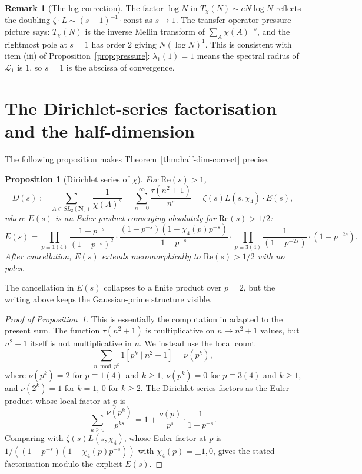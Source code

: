 ﻿\documentclass[11pt]{article}
\newtheorem{proposition}[theorem]{Proposition}
\theoremstyle{definition}
\newtheorem{remark}[theorem]{Remark}
\newcommand{\Nz}{\mathbf{N}_0}
\newcommand{\SLNz}{SL_2(\Nz)}
\newcommand{\Lop}{\mathcal{L}}
\newcommand{\chiA}{\chi}
\begin{document}
\begin{remark}[The log correction]
The factor $\log N$ in $T_\chi(N)\sim cN\log N$ reflects the doubling $\zeta\cdot L\sim (s-1)^{-1}\cdot\text{const}$ as $s\to 1$. The transfer-operator pressure picture says: $T_\chi(N)$ is the inverse Mellin transform of $\sum_A\chiA(A)^{-s}$, and the rightmost pole at $s=1$ has order $2$ giving $N(\log N)^1$. This is consistent with item (iii) of Proposition~\ref{prop:pressure}: $\lambda_1(1)=1$ means the spectral radius of $\Lop_1$ is $1$, so $s=1$ is the abscissa of convergence.
\end{remark}

\section{The Dirichlet-series factorisation and the half-dimension}\label{sec:half-dim}

The following proposition makes Theorem~\ref{thm:half-dim-correct} precise.

\begin{proposition}[Dirichlet series of $\chiA$]\label{prop:dirichlet}
For $\mathrm{Re}(s)>1$,
\[
D(s):=\sum_{A\in\SLNz}\frac{1}{\chiA(A)^s} = \sum_{n=0}^\infty\frac{\tau(n^2+1)}{n^s} = \zeta(s)L(s,\chi_4)\cdot E(s),
\]
where $E(s)$ is an Euler product converging absolutely for $\mathrm{Re}(s)>1/2$:
\[
E(s) = \prod_{p\equiv 1(4)}\frac{1+p^{-s}}{(1-p^{-s})^2}\cdot\frac{(1-p^{-s})(1-\chi_4(p)p^{-s})}{1+p^{-s}}\cdot\prod_{p\equiv 3(4)}\frac{1}{(1-p^{-2s})}\cdot(1-p^{-2s}).
\]
After cancellation, $E(s)$ extends meromorphically to $\mathrm{Re}(s)>1/2$ with no poles.
\end{proposition}

The cancellation in $E(s)$ collapses to a finite product over $p=2$, but the writing above keeps the Gaussian-prime structure visible.

\begin{proof}[Proof of Proposition~\ref{prop:dirichlet}]
This is essentially the computation in \cite[\S5]{deshouillers-iwaniec} adapted to the present sum. The function $\tau(n^2+1)$ is multiplicative on $n\to n^2+1$ values, but $n^2+1$ itself is not multiplicative in $n$. We instead use the local count
\[
\sum_{n\bmod p^k}1[p^k\mid n^2+1] = \nu(p^k),
\]
where $\nu(p^k)=2$ for $p\equiv 1(4)$ and $k\ge 1$, $\nu(p^k)=0$ for $p\equiv 3(4)$ and $k\ge 1$, and $\nu(2^k)=1$ for $k=1$, $0$ for $k\ge 2$. The Dirichlet series factors as the Euler product whose local factor at $p$ is
\[
\sum_{k\ge 0}\frac{\nu(p^k)}{p^{ks}} = 1 + \frac{\nu(p)}{p^s}\cdot\frac{1}{1-p^{-s}}.
\]
Comparing with $\zeta(s)L(s,\chi_4)$, whose Euler factor at $p$ is $1/((1-p^{-s})(1-\chi_4(p)p^{-s}))$ with $\chi_4(p)=\pm 1,0$, gives the stated factorisation modulo the explicit $E(s)$.
\end{proof}
\end{document}
